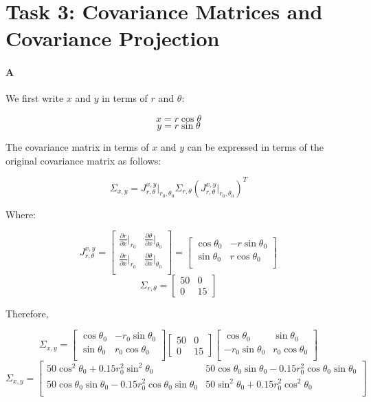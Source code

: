 \documentclass[12pt]{article}
\begin{document}
\section{Task 3: Covariance Matrices and Covariance Projection}

\paragraph{A}

We first write $x$ and $y$ in terms of $r$ and $\theta$:

\[x = r\cos\theta\]
\[y = r\sin\theta\]


The covariance matrix in terms of $x$ and $y$ can be expressed in terms of the original covariance matrix as follows:

\[
\Sigma_{x,y} = J_{r,\theta}^{x,y}|_{r_0,\theta_0} \Sigma_{r,\theta}\left(J_{r,\theta}^{x,y}|_{r_0,\theta_0}\right)^T
\]

Where:

\[
J_{r,\theta}^{x,y} =
\left[ {\begin{array}{cc}
	\frac{\partial r}{\partial x}|_{r_0} & \frac{\partial \theta}{\partial x}|_{\theta_0}  \\[5pt]
	\frac{\partial r}{\partial x}|_{r_0} & \frac{\partial \theta}{\partial x}|_{\theta_0}  \\[5pt]
	 \end{array} } \right] =
\left[ {\begin{array}{cc}
	\cos\theta_0 & -r\sin\theta_0  \\
	\sin\theta_0 & r\cos\theta_0  \\
	 \end{array} } \right]
\]
\[
\Sigma_{r,\theta} =
\left[ {\begin{array}{cc}
	50 & 0  \\
	0 & 15 \end{array} }\right]
\]

Therefore,

\[
\Sigma_{x,y} = \left[ {\begin{array}{cc}
	\cos\theta_0 & -r_0\sin\theta_0  \\
	\sin\theta_0 & r_0\cos\theta_0  \\
	 \end{array} } \right]
	 	\left[ {\begin{array}{cc}
	50 & 0  \\
	0 & 15 \end{array} }\right]
	\left[ {\begin{array}{cc}
	\cos\theta_0 & \sin\theta_0  \\
	-r_0\sin\theta_0 & r_0\cos\theta_0  \\
	 \end{array} } \right] \]
\[
\Sigma_{x,y} = \left[ {\begin{array}{cc}
		50\cos^2\theta_0 + 0.15r_0^2\sin^2\theta_0 & 50\cos\theta_0\sin\theta_0 - 0.15r_0^2\cos\theta_0\sin\theta_0  \\[5pt]
	50\cos\theta_0\sin\theta_0 - 0.15r_0^2\cos\theta_0\sin\theta_0 & 50\sin^2\theta_0 + 0.15r_0^2\cos^2\theta_0 \\[5pt]
	 \end{array} } \right]
\]
\end{document}
